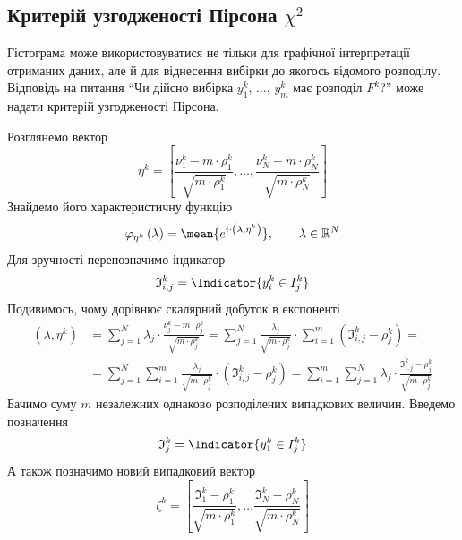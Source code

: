 \subsection{Критерій узгодженості Пірсона $\chi^2$}
Гістограма може використовуватися не тільки для графічної інтерпретації
отриманих даних, але й для віднесення вибірки до якогось відомого розподілу.
Відповідь на питання ``Чи дійсно вибірка $y_1^k$, $\dots$, $y_m^k$ має розподіл
$F^k$?'' може надати критерій узгодженості Пірсона.

Розглянемо вектор
\begin{equation*}
    \eta^k
    = \left[ \frac{\nu_1^k - m \cdot \rho_1^k}{\sqrt{m \cdot \rho_1^k}}, \dots,
      \frac{\nu_N^k - m \cdot \rho_N^k}{\sqrt{m \cdot \rho_N^k}} \right]
\end{equation*}
Знайдемо його характеристичну функцію
\begin{equation*}
  \varphi_{\eta^k}\left( \lambda\right)
  = \mean{e^{i \cdot \left( \lambda, \eta^k \right)}},\qquad
  \lambda \in \mathbb{R}^N
\end{equation*}
Для зручності перепозначимо індикатор
\begin{equation*}
  \mathfrak{I}_{i,j}^k = \Indicator{y_i^k \in I_j^k}
\end{equation*}
Подивимось, чому дорівнює скалярний добуток в експоненті
\begin{equation*}
  \begin{split}
    \left( \lambda, \eta^k \right)
    &= \sum_{j=1}^{N} \lambda_j \cdot \frac{\nu_j^k - m \cdot \rho_j^k}{
      \sqrt{m \cdot \rho_j^k}}
    = \sum_{j=1}^{N}\frac{\lambda_j}{\sqrt{m \cdot \rho_j^k}}
      \cdot \sum_{i=1}^{m}\left( \mathfrak{I}_{i,j}^k - \rho_j^k \right) = \\
    &= \sum_{j=1}^{N} \sum_{i=1}^{m}
      \frac{\lambda_j}{\sqrt{m \cdot \rho_j^k}}
      \cdot \left( \mathfrak{I}_{i,j}^k - \rho_j^k \right)
    = \sum_{i=1}^{m} \sum_{j=1}^{N} \lambda_j \cdot
      \frac{\mathfrak{I}_{i,j}^k - \rho_j^k}{\sqrt{m \cdot \rho_j^k}}
  \end{split}
\end{equation*}
Бачимо суму $m$ незалежних однаково розподілених випадкових величин.
Введемо позначення
\begin{equation*}
  \mathfrak{I}_j^k = \Indicator{y_1^k \in I_j^k}
\end{equation*}
А також позначимо новий випадковий вектор
\begin{equation*}
  \zeta^k
  = \left[ \frac{\mathfrak{I}_1^k - \rho_1^k}{\sqrt{m \cdot \rho_1^k}},
    \dots
    \frac{\mathfrak{I}_N^k - \rho_N^k}{\sqrt{m \cdot \rho_N^k}} \right]
\end{equation*}
